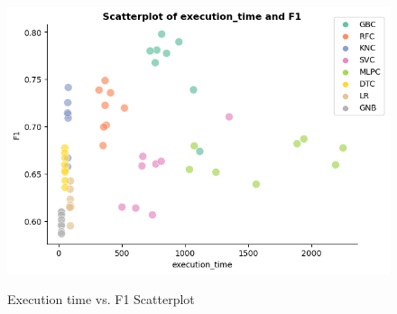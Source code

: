 \begin{figure}[H]
    \centering
    \caption{Execution time vs. F1 Scatterplot}\vspace{0.5em}
    \label{fig:scattertime}\
    \includegraphics[width=140mm]{Figures/scatter_time.jpg}
    \vspace{-1em}
\end{figure}

